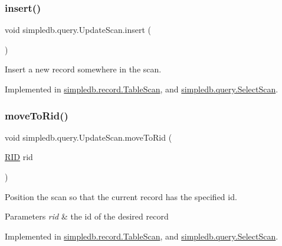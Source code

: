\mbox{\label{interfacesimpledb_1_1query_1_1UpdateScan_a6a281cd50f596c008e868bddd0534774}} 
\subsubsection{\texorpdfstring{insert()}{insert()}}
{\footnotesize\ttfamily void simpledb.\+query.\+Update\+Scan.\+insert (\begin{DoxyParamCaption}{ }\end{DoxyParamCaption})}

Insert a new record somewhere in the scan. 

Implemented in \hyperlink{classsimpledb_1_1record_1_1TableScan_a45f93916b026b51b1511ba2610630564}{simpledb.\+record.\+Table\+Scan}, and \hyperlink{classsimpledb_1_1query_1_1SelectScan_aef5c943c4a905265c588913e2f9958c2}{simpledb.\+query.\+Select\+Scan}.

\mbox{\label{interfacesimpledb_1_1query_1_1UpdateScan_a5096e90da6d88cfaa015cd3aa20bc9d7}} 
\subsubsection{\texorpdfstring{move\+To\+Rid()}{moveToRid()}}
{\footnotesize\ttfamily void simpledb.\+query.\+Update\+Scan.\+move\+To\+Rid (\begin{DoxyParamCaption}\item[{\hyperlink{classsimpledb_1_1record_1_1RID}{R\+ID}}]{rid }\end{DoxyParamCaption})}

Position the scan so that the current record has the specified id. 
\begin{DoxyParams}{Parameters}
{\em rid} & the id of the desired record \\
\hline
\end{DoxyParams}


Implemented in \hyperlink{classsimpledb_1_1record_1_1TableScan_a21372d00e959d8bbe5eee1c8bda8f08b}{simpledb.\+record.\+Table\+Scan}, and \hyperlink{classsimpledb_1_1query_1_1SelectScan_ae2a640b4e49eb8cb5fef5f48103dca3e}{simpledb.\+query.\+Select\+Scan}.

